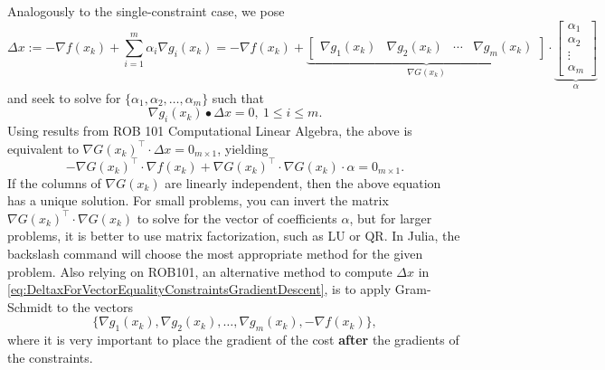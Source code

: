 Analogously to the single-constraint case, we pose
\begin{equation}
\label{eq:DeltaxForVectorEqualityConstraintsGradientDescent}
 \Delta x := -\nabla f(x_k) + \sum_{i=1}^m \alpha_i \nabla g_i(x_k) = -\nabla f(x_k) + \underbrace{\left[\begin{array}{cccc} \nabla g_1(x_k) & \nabla g_2(x_k)&  \cdots& \nabla g_m(x_k) \end{array} \right]}_{\nabla G(x_k)} \cdot \underbrace{\left[\begin{array}{c} \alpha_1 \\ \alpha_2 \\ \vdots \\ \alpha_m\end{array} \right] }_{\alpha}
\end{equation}
and seek to solve for $\{\alpha_1, \alpha_2, \ldots, \alpha_m\}$ such that
\begin{equation}
    \nabla g_i(x_k) \bullet \Delta x = 0, ~ 1 \le i \le m.
\end{equation}
Using results from ROB 101 Computational Linear Algebra, the above is equivalent to $\nabla G(x_k)^\top \cdot \Delta x = 0_{m \times 1}$, yielding
\begin{equation}
\label{eq:FindDeltaxGradientDescentViaLinearAlgebra}
    -\nabla G(x_k)^\top \cdot \nabla f(x_k) + \nabla G(x_k)^\top \cdot \nabla G(x_k) \cdot \alpha= 0_{m \times 1}.
\end{equation}
If the columns of $\nabla G(x_k)$ are linearly independent, then the above equation has a unique solution. For small problems, you can invert the matrix $\nabla G(x_k)^\top \cdot \nabla G(x_k)$ to solve for the vector of coefficients $\alpha$, but for larger problems, it is better to use matrix factorization, such as LU or QR. In Julia, the backslash command will choose the most appropriate method for the given problem. Also relying on ROB101, an alternative method to compute $\Delta x$ in \eqref{eq:DeltaxForVectorEqualityConstraintsGradientDescent}, is to apply Gram-Schmidt to the vectors
\begin{equation}
    \{\nabla g_1(x_k), \nabla g_2(x_k), \ldots, \nabla g_m(x_k), -\nabla f(x_k) \},
\end{equation}
where it is very important to place the gradient of the cost \textbf{after} the gradients of the constraints.

